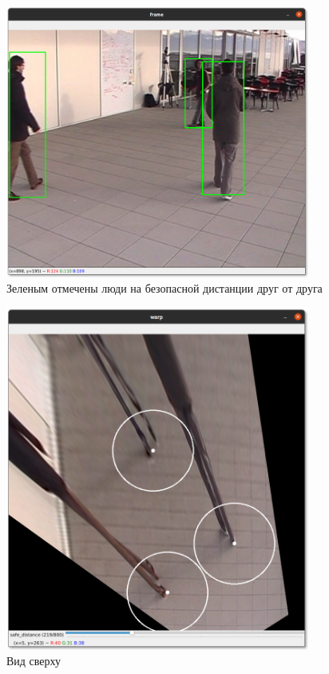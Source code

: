 \begin{figure}[H]
    \centering
    \includegraphics[width=10cm]{images/safe1.png}
    \caption{Зеленым отмечены люди на безопасной дистанции друг от друга}
    \label{<label>}
\end{figure}

\begin{figure}[H]
    \centering
    \includegraphics[width=10cm]{images/safe2.png}
    \caption{Вид сверху}
    \label{<label>}
\end{figure}

